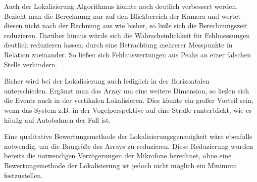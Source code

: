 Auch der Lokalisierung Algorithmus könnte noch deutlich verbessert werden. Bezieht man die Berechnung nur auf den Blickbereich der Kamera und wertet diesen nicht nach der Rechnung aus wie bisher, so ließe sich die Berechnungszeit reduzieren. Darüber hinaus würde sich die Wahrscheinlichkeit für Fehlmessungen deutlich reduzieren lassen, durch eine Betrachtung mehrerer Messpunkte in Relation zueinander. So ließen sich Fehlauswertungen aus Peaks an einer falschen Stelle verhindern.

Bisher wird bei der Lokalisierung auch lediglich in der Horizontalen unterschieden. Ergänzt man das Array um eine weitere Dimension, so ließen sich die Events auch in der vertikalen Lokalisieren. Dies könnte ein großer Vorteil sein, wenn das System z.B. in der Vogelperspektive auf eine Straße runterblickt, wie es häufig auf Autobahnen der Fall ist.

Eine qualitative Bewertungsmethode der Lokalisierungsgenauigkeit wäre ebenfalls notwendig, um die Baugröße des Arrays zu reduzieren. Diese Reduzierung wurden bereits die notwendigen Verzögerungen der Mikrofone berechnet, ohne eine Bewertungsmethode der Lokalisierung ist jedoch nicht möglich ein Minimum festzustellen. 